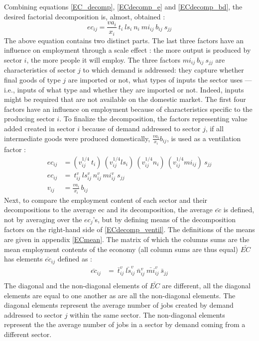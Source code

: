 \documentclass[12pt,english]{article}
\begin{document}
Combining equations \ref{EC_decomp}, \ref{ECdecomp_e} and \ref{ECdecomp_bd}, the desired factorial decomposition is, almost, obtained :
\begin{equation}
ec_{ij} = \frac{va_i}{x_i} \ t_i \ ls_i \ n_i \ mi_{ij} \ b_{ij} \ s_{jj}
\end{equation}
The above equation contains two distinct parts. The last three factors %
have an influence on employment through a scale effect : the more output is produced by sector $i$, the more people it will employ.%
The three factors $mi_{ij} \ b_{ij} \ s_{jj}$ are characteristics of sector $j$ to which demand is addressed: they capture whether final goods of type $j$ are imported or not, what types of inputs the sector uses --- i.e., inputs of what type and whether they are imported or not. Indeed, inputs might be required that are not available on the domestic market. The first four factors have an influence on employment because of characteristics specific to the producing sector $i$. To finalize the decomposition, the factors representing value added created in sector $i$ because of demand addressed to sector $j$, if all intermediate goods were produced domestically, $\frac{va_i}{x_i} b_{ij}$, is used as a ventilation factor :
\begin{align}
ec_{ij} &= (v_{ij}^{1/4} \ t_i) \ (v_{ij}^{1/4}ls_i) \ (v_{ij}^{1/4}n_i) \ (v_{ij}^{1/4}mi_{ij})  \ s_{jj}  \\
ec_{ij} &=  \ t^v_{ij} \ ls^v_{ij} \ n^v_{ij} \ mi^v_{ij}  \ s_{jj} \label{ECdecomp_ventil} \\
v_{ij} &=  \frac{va_i}{x_i} \, b_{ij}
\end{align}
Next, to compare the employment content of each sector and their decompositions to the average ec and its decomposition, the average $\bar{ec}$ is defined, not by averaging over the $ec_j$'s, but by defining means of the decomposition factors on the right-hand side of 
\ref{ECdecomp_ventil}. The definitions of the means are given in appendix \ref{ECmean}. The matrix of which the columns sums are the mean employment contents of the economy (all column sums are thus equal) $\bar{EC}$ has elements $\bar{ec}_{ij}$ defined as : 
\begin{align}
\bar{ec}_{ij} &=  \ \bar{t}^v_{ij} \ \bar{ls}^v_{ij} \ \bar{n}^v_{ij} \ \bar{mi}^v_{ij}  \ \bar{s}_{jj} \label{ECdecomp_ventil_mean} \\
\end{align}
The diagonal and the non-diagonal elements of $\bar{EC}$ are different, all the diagonal elements are equal to one another as are all the non-diagonal elements. The diagonal elements represent the average number of jobs created by demand addressed to sector $j$ within the same sector. The non-diagonal elements represent the the average number of jobs in a sector by demand coming from a different sector. 
\end{document}
